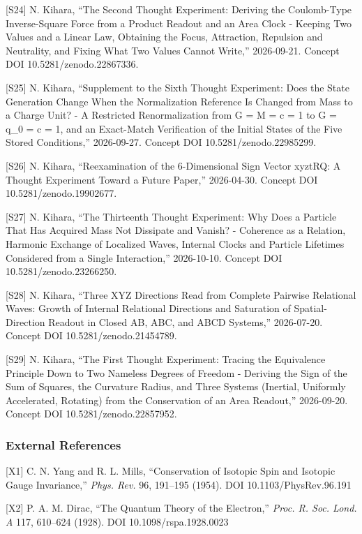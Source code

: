 \documentclass[
  a4paper,
]{article}
\begin{document}
{[}S24{]} N. Kihara, ``The Second Thought Experiment: Deriving the
Coulomb-Type Inverse-Square Force from a Product Readout and an Area
Clock - Keeping Two Values and a Linear Law, Obtaining the Focus,
Attraction, Repulsion and Neutrality, and Fixing What Two Values Cannot
Write,'' 2026-09-21. Concept DOI 10.5281/zenodo.22867336.

{[}S25{]} N. Kihara, ``Supplement to the Sixth Thought Experiment: Does
the State Generation Change When the Normalization Reference Is Changed
from Mass to a Charge Unit? - A Restricted Renormalization from G = M =
c = 1 to G = q\_0 = c = 1, and an Exact-Match Verification of the
Initial States of the Five Stored Conditions,'' 2026-09-27. Concept DOI
10.5281/zenodo.22985299.

{[}S26{]} N. Kihara, ``Reexamination of the 6-Dimensional Sign Vector
xyztRQ: A Thought Experiment Toward a Future Paper,'' 2026-04-30.
Concept DOI 10.5281/zenodo.19902677.

{[}S27{]} N. Kihara, ``The Thirteenth Thought Experiment: Why Does a
Particle That Has Acquired Mass Not Dissipate and Vanish? - Coherence as
a Relation, Harmonic Exchange of Localized Waves, Internal Clocks and
Particle Lifetimes Considered from a Single Interaction,'' 2026-10-10.
Concept DOI 10.5281/zenodo.23266250.

{[}S28{]} N. Kihara, ``Three XYZ Directions Read from Complete Pairwise
Relational Waves: Growth of Internal Relational Directions and
Saturation of Spatial-Direction Readout in Closed AB, ABC, and ABCD
Systems,'' 2026-07-20. Concept DOI 10.5281/zenodo.21454789.

{[}S29{]} N. Kihara, ``The First Thought Experiment: Tracing the
Equivalence Principle Down to Two Nameless Degrees of Freedom - Deriving
the Sign of the Sum of Squares, the Curvature Radius, and Three Systems
(Inertial, Uniformly Accelerated, Rotating) from the Conservation of an
Area Readout,'' 2026-09-20. Concept DOI 10.5281/zenodo.22857952.

\subsubsection{External References}\label{external-references}

{[}X1{]} C. N. Yang and R. L. Mills, ``Conservation of Isotopic Spin and
Isotopic Gauge Invariance,'' \emph{Phys. Rev.} 96, 191--195 (1954). DOI
10.1103/PhysRev.96.191

{[}X2{]} P. A. M. Dirac, ``The Quantum Theory of the Electron,''
\emph{Proc. R. Soc. Lond. A} 117, 610--624 (1928). DOI
10.1098/rspa.1928.0023
\end{document}
